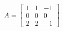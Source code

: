 \documentclass[preview]{standalone}
\begin{document}
\begin{align*}
A = \begin{bmatrix} 1 & 1 & -1 \\ 0 & 0 & 0 \\ 2 & 2 & -1 \end{bmatrix}
\end{align*}
\end{document}
